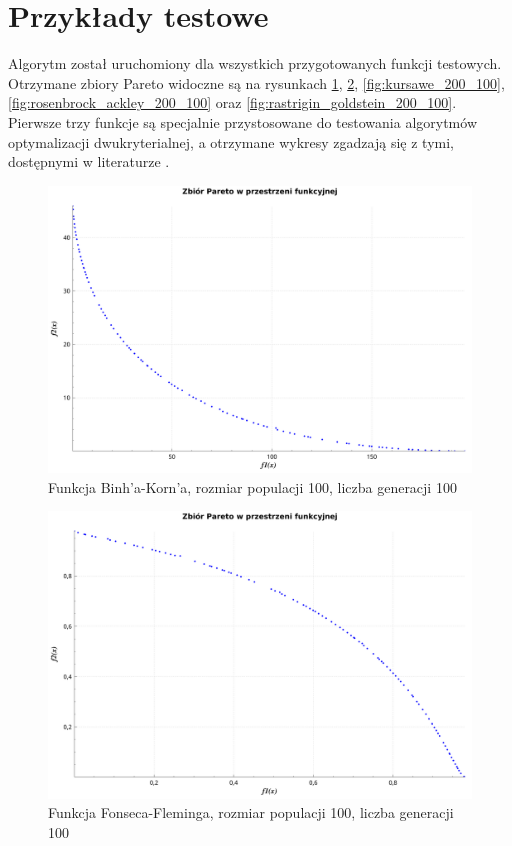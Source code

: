 \documentclass[11pt,a4paper]{article}
\begin{document}
\section{Przykłady testowe}

Algorytm został uruchomiony dla wszystkich przygotowanych funkcji testowych. Otrzymane zbiory Pareto widoczne są na rysunkach \ref{fig:binh_korn_100_100}, \ref{fig:fonsec_fleming_100_100}, \ref{fig:kursawe_200_100}, \ref{fig:rosenbrock_ackley_200_100} oraz \ref{fig:rastrigin_goldstein_200_100}. Pierwsze trzy funkcje są specjalnie przystosowane do testowania algorytmów optymalizacji dwukryterialnej, a otrzymane wykresy zgadzają się z tymi, dostępnymi w literaturze \cite{deb} \cite{wiki}. 

\begin{figure}[H]
\centering
\includegraphics[width=14cm]{binh_korn_100_100}
\caption{Funkcja Binh'a-Korn'a, rozmiar populacji 100, liczba generacji 100}
\label{fig:binh_korn_100_100}
\end{figure}

\begin{figure}[H]
\centering
\includegraphics[width=14cm]{fonsec_fleming_100_100}
\caption{Funkcja Fonseca-Fleminga, rozmiar populacji 100, liczba generacji 100}
\label{fig:fonsec_fleming_100_100}
\end{figure}
\end{document}
